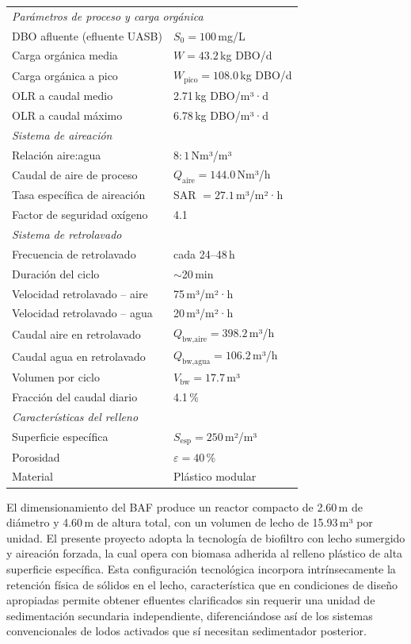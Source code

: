\documentclass[12pt,a4paper]{article}
\begin{document}
\begin{longtable}{p{7cm}p{6cm}}
%
\multicolumn{2}{l}{\textit{Parámetros de proceso y carga orgánica}} \\[2pt]
DBO afluente (efluente UASB)  & $S_0 = 100$\,mg/L \\
Carga orgánica media          & $W = 43.2$\,kg DBO/d \\
Carga orgánica a pico         & $W_{\text{pico}} = 108.0$\,kg DBO/d \\
OLR a caudal medio            & 2.71\,kg DBO/m³·d \\
OLR a caudal máximo           & 6.78\,kg DBO/m³·d \\[4pt]
%
\multicolumn{2}{l}{\textit{Sistema de aireación}} \\[2pt]
Relación aire:agua            & $8:1$\,Nm³/m³ \\
Caudal de aire de proceso     & $Q_{\text{aire}} = 144.0$\,Nm³/h \\
Tasa específica de aireación  & SAR $= 27.1$\,m³/m²·h \\
Factor de seguridad oxígeno   & 4.1 \\[4pt]
%
\multicolumn{2}{l}{\textit{Sistema de retrolavado}} \\[2pt]
Frecuencia de retrolavado     & cada 24--48\,h \\
Duración del ciclo            & $\sim$20\,min \\
Velocidad retrolavado -- aire & 75\,m³/m²·h \\
Velocidad retrolavado -- agua & 20\,m³/m²·h \\
Caudal aire en retrolavado    & $Q_{\text{bw,aire}} = 398.2$\,m³/h \\
Caudal agua en retrolavado    & $Q_{\text{bw,agua}} = 106.2$\,m³/h \\
Volumen por ciclo             & $V_{\text{bw}} = 17.7$\,m³ \\
Fracción del caudal diario    & 4.1\,\% \\[4pt]
%
\multicolumn{2}{l}{\textit{Características del relleno}} \\[2pt]
Superficie específica         & $S_{\text{esp}} = 250$\,m²/m³ \\
Porosidad                     & $\varepsilon = 40$\,\% \\
Material                      & Plástico modular \\
\end{longtable}

El dimensionamiento del BAF produce un reactor compacto de 2.60\,m de diámetro y 4.60\,m de altura total, con un volumen de lecho de 15.93\,m³ por unidad. El presente proyecto adopta la tecnología de biofiltro con lecho sumergido y aireación forzada, la cual opera con biomasa adherida al relleno plástico de alta superficie específica. Esta configuración tecnológica incorpora intrínsecamente la retención física de sólidos en el lecho, característica que en condiciones de diseño apropiadas permite obtener efluentes clarificados sin requerir una unidad de sedimentación secundaria independiente, diferenciándose así de los sistemas convencionales de lodos activados que sí necesitan sedimentador posterior.
\end{document}

